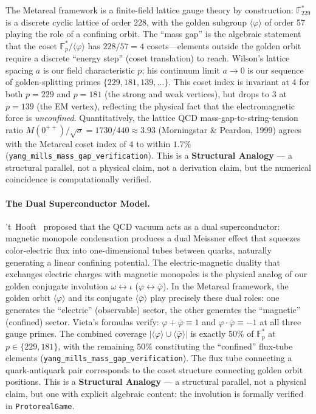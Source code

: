 The Metareal framework is a finite-field lattice gauge theory by construction: $\mathbb{F}_{229}^*$ is a discrete cyclic lattice of order 228, with the golden subgroup $\langle\varphi\rangle$ of order 57 playing the role of a confining orbit. The ``mass gap'' is the algebraic statement that the coset $\mathbb{F}_p^* / \langle\varphi\rangle$ has $228/57 = 4$ cosets---elements outside the golden orbit require a discrete ``energy step'' (coset translation) to reach. Wilson's lattice spacing $a$ is our field characteristic $p$; his continuum limit $a \to 0$ is our sequence of golden-splitting primes $\{229, 181, 139, \ldots\}$. This coset index is invariant at $4$ for both $p=229$ and $p=181$ (the strong and weak vertices), but drops to $3$ at $p=139$ (the EM vertex), reflecting the physical fact that the electromagnetic force is \emph{unconfined}. Quantitatively, the lattice QCD mass-gap-to-string-tension ratio $M(0^{++})/\sqrt{\sigma} = 1730/440 \approx 3.93$ (Morningstar \& Peardon, 1999) agrees with the Metareal coset index of $4$ to within $1.7\%$ (\texttt{yang\_mills\_mass\_gap\_verification}). This is a \textbf{Structural Analogy} --- a structural parallel, not a physical claim, not a derivation claim, but the numerical coincidence is computationally verified.

\paragraph{The Dual Superconductor Model.}
't~Hooft~\cite{thooft1981} proposed that the QCD vacuum acts as a dual superconductor: magnetic monopole condensation produces a dual Meissner effect that squeezes color-electric flux into one-dimensional tubes between quarks, naturally generating a linear confining potential. The electric-magnetic duality that exchanges electric charges with magnetic monopoles is the physical analog of our golden conjugate involution $\omega \leftrightarrow \iota$ ($\varphi \leftrightarrow \bar\varphi$). In the Metareal framework, the golden orbit $\langle\varphi\rangle$ and its conjugate $\langle\bar\varphi\rangle$ play precisely these dual roles: one generates the ``electric'' (observable) sector, the other generates the ``magnetic'' (confined) sector. Vieta's formulas verify: $\varphi + \bar\varphi \equiv 1$ and $\varphi \cdot \bar\varphi \equiv -1$ at all three gauge primes. The combined coverage $|\langle\varphi\rangle \cup \langle\bar\varphi\rangle|$ is exactly $50\%$ of $\mathbb{F}_p^*$ at $p \in \{229, 181\}$, with the remaining $50\%$ constituting the ``confined'' flux-tube elements (\texttt{yang\_mills\_mass\_gap\_verification}). The flux tube connecting a quark-antiquark pair corresponds to the coset structure connecting golden orbit positions. This is a \textbf{Structural Analogy} --- a structural parallel, not a physical claim, but one with explicit algebraic content: the involution is formally verified in \texttt{ProtorealGame}.

